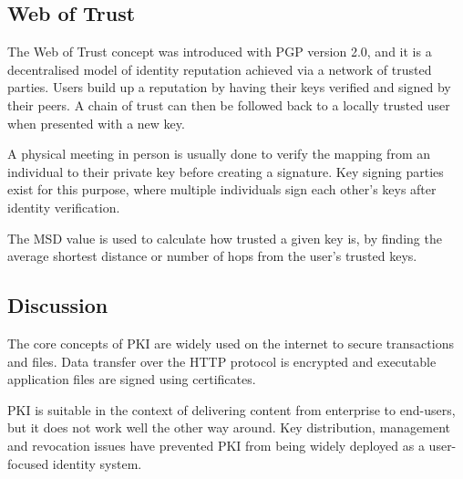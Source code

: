 \subsection{Web of Trust}
\label{sec:web-of-trust}
The Web of Trust \cite{the_free_software_foundation_gnu_1999} concept was introduced with PGP version 2.0, and it is a decentralised model of identity reputation achieved via a network of trusted parties. Users build up a reputation by having their keys verified and signed by their peers. A chain of trust can then be followed back to a locally trusted user when presented with a new key.

A physical meeting in person is usually done to verify the mapping from an individual to their private key before creating a signature. Key signing parties \cite{brennan_keysigning_2008} exist for this purpose, where multiple individuals sign each other's keys after identity verification.

The \ac{MSD} value is used to calculate how trusted a given key is, by finding the average shortest distance or number of hops from the user's trusted keys.

\subsection{Discussion}
The core concepts of \ac{PKI} are widely used on the internet to secure transactions and files. Data transfer over the HTTP protocol is encrypted and executable application files are signed using certificates. 

\ac{PKI} is suitable in the context of delivering content from enterprise to end-users, but it does not work well the other way around. Key distribution, management and revocation issues have prevented \ac{PKI} from being widely deployed as a user-focused identity system.